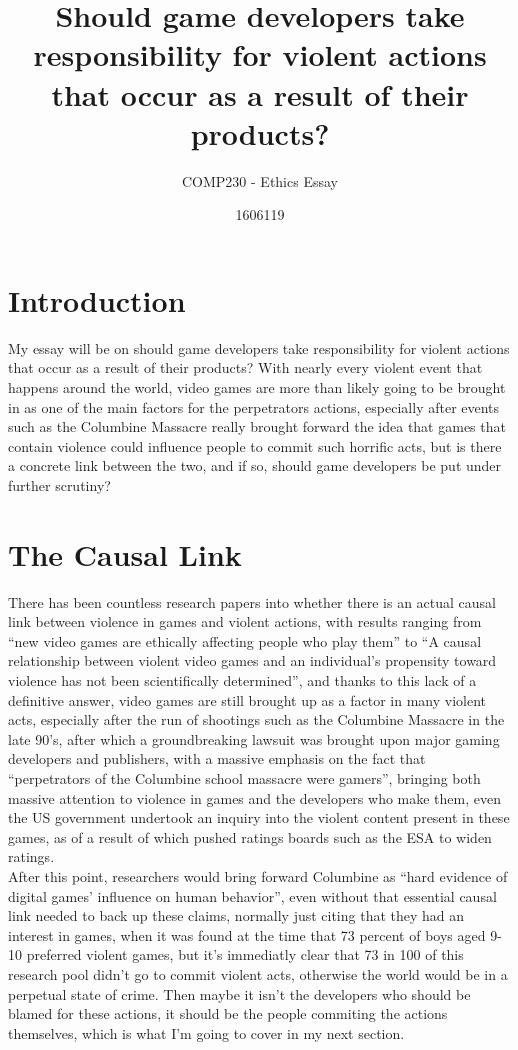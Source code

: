 \documentclass{scrartcl}
\title{Should game developers take responsibility for violent actions that occur as a result of their products?}
\subtitle{COMP230 - Ethics Essay}
\author{1606119}
\begin{document}
\maketitle

\abstract{} 

\section{Introduction}
My essay will be on should game developers take responsibility for violent actions that occur as a result of their products? With nearly every violent event that happens around the world, video games are more than likely going to be brought in as one of the main factors for the perpetrators actions, especially after events such as the Columbine Massacre really brought forward the idea that games that contain violence could influence people to commit such horrific acts, but is there a concrete link between the two, and if so, should game developers be put under further scrutiny?

\section{The Causal Link}
There has been countless research papers into whether there is an actual causal link between violence in games and violent actions, with results ranging from ``new video games are ethically affecting people who play them''\cite{lekka2014computer} to ``A causal relationship between violent video games and an individual’s propensity toward violence has not been scientifically determined''\cite{chakraborty2015public}, and thanks to this lack of a definitive answer, video games are still brought up as a factor in many violent acts, especially after the run of shootings such as the Columbine Massacre in the late 90's, after which a groundbreaking lawsuit was brought upon major gaming developers and publishers\cite{familysue}, with a massive emphasis on the fact that ``perpetrators of the Columbine school massacre were gamers''\cite{tavinor2007towards}, bringing both massive attention to violence in games and the developers who make them, even the US government undertook an inquiry into the violent content present in these games, as of a result of which pushed ratings boards such as the ESA to widen ratings\cite{thayer2007analyzing}.\\

 After this point, researchers would bring forward Columbine as  ``hard evidence of digital games’ influence on human behavior''\cite{thayer2007analyzing}, even without that essential causal link needed to back up these claims, normally just citing that they had an interest in games, when it was found at the time that 73 percent of boys aged 9-10 preferred violent games\cite{chakraborty2015public}, but it's immediatly clear that 73 in 100 of this research pool didn't go to commit violent acts, otherwise the world would be in a perpetual state of crime. Then maybe it isn't the developers who should be blamed for these actions, it should be the people commiting the actions themselves, which is what I'm going to cover in my next section. 
\end{document}
